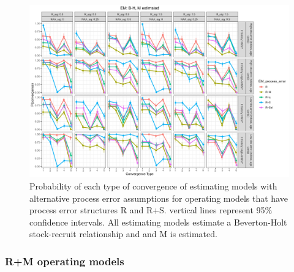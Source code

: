 \documentclass[
  12pt,
]{article}
\begin{document}
\begin{landscape}
\begin{figure}
\caption{Probability of each type of convergence of estimating models with alternative process error assumptions for operating models that have process error structures R and R+S. vertical lines represent 95\% confidence intervals. All estimating models estimate a Beverton-Holt stock-recruit relationship and and M is estimated.}\label{naa_om_em_BH_ME_convergence}
\begin{center}
\includegraphics[width = \textwidth]{naa_om_p_convergence_BH_M_estimated.png}
\end{center}
\end{figure}
\end{landscape}

\hypertarget{rm-operating-models}{%
\subsubsection{R+M operating models}\label{rm-operating-models}}
\end{document}
